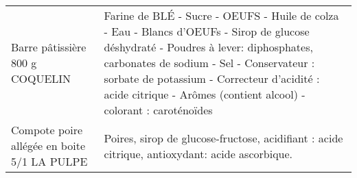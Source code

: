 \begin{longtable}{p{5cm}p{10cm}}
                                                                          Barre pâtissière 800 g COQUELIN &                                                                                                                                                                                                                                                                                                                                                                                                                                                                                                                                                                                                                                                                                                                                       Farine de BLÉ - Sucre - OEUFS - Huile de colza - Eau - Blancs d'OEUFs - Sirop de glucose déshydraté - Poudres à lever: diphosphates, carbonates de sodium - Sel - Conservateur : sorbate de potassium - Correcteur d'acidité : acide citrique - Arômes (contient alcool) - colorant : caroténoïdes \\
                                                              Compote poire allégée en boite 5/1 LA PULPE &                                                                                                                                                                                                                                                                                                                                                                                                                                                                                                                                                                                                                                                                                                                                                                                                                                                                                                                                           Poires, sirop de glucose-fructose, acidifiant : acide citrique, antioxydant: acide ascorbique. \\

\end{longtable}
